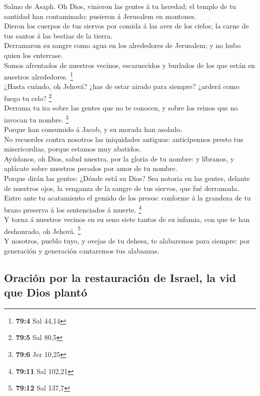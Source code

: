  Salmo de Asaph. Oh Dios, vinieron las gentes á tu
heredad; el templo de tu santidad han contaminado; pusieron á Jerusalem
en montones.\\
 Dieron los cuerpos de tus siervos por comida á las aves
de los cielos; la carne de tus santos á las bestias de la tierra.\\
 Derramaron su sangre como agua en los alrededores de
Jerusalem; y no hubo quien los enterrase.\\
 Somos afrentados de nuestros vecinos, escarnecidos y
burlados de los que están en nuestros alrededores. \footnote{\textbf{79:4}
  Sal 44,14}\\
 ¿Hasta cuándo, oh Jehová? ¿has de estar airado para
siempre? ¿arderá como fuego tu celo? \footnote{\textbf{79:5} Sal 80,5}\\
 Derrama tu ira sobre las gentes que no te conocen, y
sobre los reinos que no invocan tu nombre. \footnote{\textbf{79:6} Jer
  10,25}\\
 Porque han consumido á Jacob, y su morada han asolado.\\
 No recuerdes contra nosotros las iniquidades antiguas:
anticípennos presto tus misericordias, porque estamos muy abatidos.\\
 Ayúdanos, oh Dios, salud nuestra, por la gloria de tu
nombre: y líbranos, y aplácate sobre nuestros pecados por amor de tu
nombre.\\
 Porque dirán las gentes: ¿Dónde está su Dios? Sea
notoria en las gentes, delante de nuestros ojos, la venganza de la
sangre de tus siervos, que fué derramada.\\
 Entre ante tu acatamiento el gemido de los presos:
conforme á la grandeza de tu brazo preserva á los sentenciados á muerte.
\footnote{\textbf{79:11} Sal 102,21}\\
 Y torna á nuestros vecinos en su seno siete tantos de su
infamia, con que te han deshonrado, oh Jehová. \footnote{\textbf{79:12}
  Sal 137,7}\\
 Y nosotros, pueblo tuyo, y ovejas de tu dehesa, te
alabaremos para siempre: por generación y generación cantaremos tus
alabanzas.

\hypertarget{oraciuxf3n-por-la-restauraciuxf3n-de-israel-la-vid-que-dios-plantuxf3}{%
\subsection{Oración por la restauración de Israel, la vid que Dios
plantó}\label{oraciuxf3n-por-la-restauraciuxf3n-de-israel-la-vid-que-dios-plantuxf3}}

